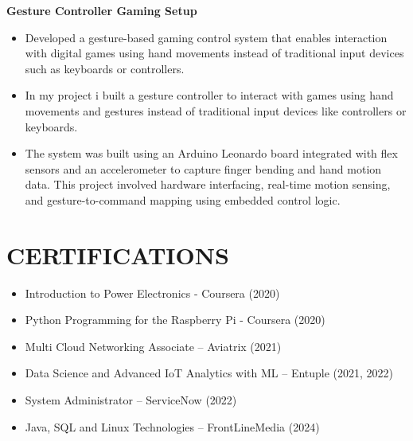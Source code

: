 \documentclass[a4paper,10pt]{article}
\begin{document}
\vspace{2mm}

\textbf{Gesture Controller Gaming Setup}
\begin{itemize}[leftmargin=*]
\item Developed a gesture-based gaming control system that enables interaction with digital games using hand movements instead of traditional input devices such as keyboards or controllers. 
\item In my project i built a gesture controller to interact with games using hand movements and gestures instead of traditional input devices like controllers or keyboards.
\item The system was built using an Arduino Leonardo board integrated with flex sensors and an accelerometer to capture finger bending and hand motion data. This project involved hardware interfacing, real-time motion sensing, and gesture-to-command mapping using embedded control logic.
\end{itemize}

\section*{CERTIFICATIONS}

\begin{itemize}[leftmargin=*]
    \item Introduction to Power Electronics - Coursera (2020)
    \item Python Programming for the Raspberry Pi - Coursera (2020)
    \item Multi Cloud Networking Associate – Aviatrix (2021)
    \item Data Science and Advanced IoT Analytics with ML – Entuple (2021, 2022)
    \item System Administrator – ServiceNow (2022)
    \item Java, SQL and Linux Technologies – FrontLineMedia (2024)
\end{itemize}
\end{document}
